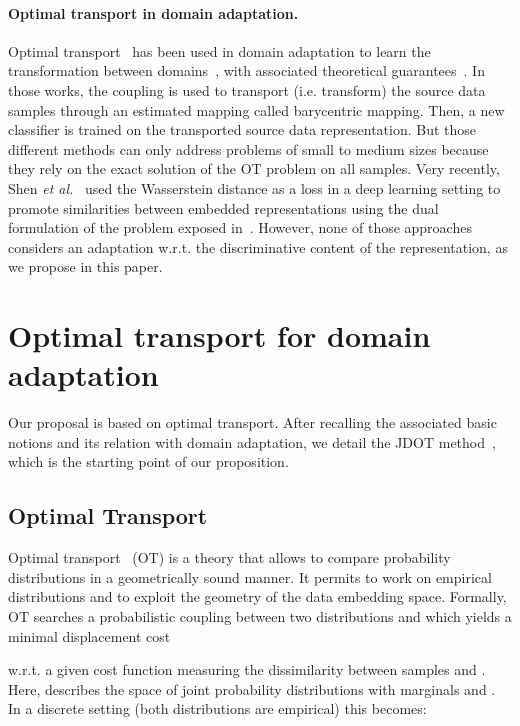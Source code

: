 \documentclass[runningheads]{llncs}
\begin{document}
\paragraph{Optimal transport in domain adaptation.} Optimal transport~\cite{monge1781memoire,Kantorovich42,Villani09} has been used in domain adaptation to learn the transformation between domains~\cite{Cou17,Cou14,Per16}, with associated theoretical guarantees~\cite{redko2017}. In those works, the coupling  is used to transport (i.e. transform) the source data samples through an estimated mapping called barycentric mapping. Then, a new classifier is trained on the transported source data representation. But those different methods can only address problems of small to medium sizes because they rely on the exact solution of the OT problem on all samples. 
Very recently, Shen {\em et al.}~\cite{Shen2018} used the Wasserstein distance as a loss in a deep learning setting to promote similarities between embedded representations using the dual formulation of the problem exposed in~\cite{arjovsky17}. However, none of those approaches considers an adaptation w.r.t. the discriminative content of the representation, as we propose in this paper.


\section{Optimal transport for domain adaptation}
\label{sec:ot}

Our proposal is based on optimal transport. After recalling the associated basic notions and its relation with domain adaptation, we detail the JDOT method~\cite{courty2017joint}, which is the starting point of our proposition.
 
\subsection{Optimal Transport}
Optimal transport~\cite{Villani09} (OT) is a theory that allows to compare probability distributions in a geometrically sound manner. It permits to work on empirical distributions and to exploit the geometry of the data embedding space. Formally, OT searches a probabilistic coupling  between two distributions  and  which yields a minimal displacement cost 
  
w.r.t. a given cost function  measuring the dissimilarity between samples  and . Here,  describes the
space of joint probability distribution{s} with marginals  and . In a discrete setting (both distributions are empirical) this becomes:
 
\end{document}
